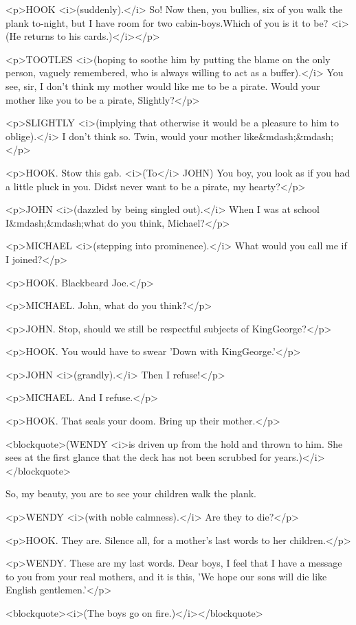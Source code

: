 <p>HOOK <i>(suddenly).</i> So! Now then, you bullies, six of you walk
the plank to-night, but I have room for two cabin-boys.Which of you
is it to be? <i>(He returns to his cards.)</i></p>

<p>TOOTLES <i>(hoping to soothe him by putting the blame on the only
person, vaguely remembered, who is always willing to act as a
buffer).</i> You see, sir, I don't think my mother would like me to
be a pirate. Would your mother like you to be a pirate, Slightly?</p>

<p>SLIGHTLY <i>(implying that otherwise it would be a pleasure to him
to oblige).</i> I don't think so. Twin, would your mother
like&mdash;&mdash;</p>

<p>HOOK. Stow this gab. <i>(To</i> JOHN) You boy, you look as if you
had a little pluck in you. Didst never want to be a pirate, my
hearty?</p>

<p>JOHN <i>(dazzled by being singled out).</i> When I was at school
I&mdash;&mdash;what do you think, Michael?</p>

<p>MICHAEL <i>(stepping into prominence).</i> What would you call me
if I joined?</p>

<p>HOOK. Blackbeard Joe.</p>

<p>MICHAEL. John, what do you think?</p>

<p>JOHN. Stop, should we still be respectful subjects of
KingGeorge?</p>

<p>HOOK. You would have to swear 'Down with KingGeorge.'</p>

<p>JOHN <i>(grandly).</i> Then I refuse!</p>

<p>MICHAEL. And I refuse.</p>

<p>HOOK. That seals your doom. Bring up their mother.</p>

<blockquote>(WENDY <i>is driven up from the hold and thrown to him.
She sees at the first glance that the deck has not been scrubbed for
years.)</i></blockquote>

So, my beauty, you are to see your children walk the plank. 

<p>WENDY <i>(with noble calmness).</i> Are they to die?</p>

<p>HOOK. They are. Silence all, for a mother's last words to her
children.</p>

<p>WENDY. These are my last words. Dear boys, I feel that I have a
message to you from your real mothers, and it is this, 'We hope our
sons will die like English gentlemen.'</p>

<blockquote><i>(The boys go on fire.)</i></blockquote>

